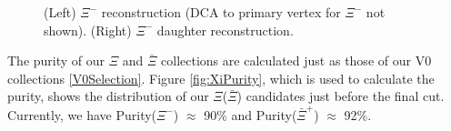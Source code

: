 \documentclass[/home/jesse/Analysis/FemtoAnalysis/AnalysisNotes/AnalysisNoteJBuxton.tex]{subfiles}
\begin{document}
\begin{figure}[h!]
  \centering
  \caption[$\Xi$ Reconstruction]{(Left) $\Xi^{-}$ reconstruction (DCA to primary vertex for $\Xi^{-}$ not shown).  (Right) $\Xi^{-}$ daughter reconstruction.}
  \label{fig:XiReconstruction}
\end{figure}





The purity of our $\Xi$ and $\bar{\Xi}$ collections are calculated just as those of our V0 collections \ref{V0Selection}.
Figure \ref{fig:XiPurity}, which is used to calculate the purity, shows the \minv distribution of our $\Xi$($\bar{\Xi}$) candidates just before the final \minv cut.  Currently, we have Purity($\Xi^{-}$) $\approx$ 90\% and Purity($\bar{\Xi}^{+}$) $\approx$ 92\%.
\end{document}
